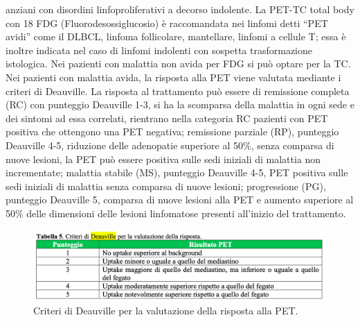 anziani con disordini linfoproliferativi a decorso indolente.
La PET-TC total body con 18 FDG (Fluorodesossiglucosio) è raccomandata nei linfomi detti “PET avidi” come il DLBCL, 
linfoma follicolare, mantellare, linfomi a cellule T; essa è inoltre indicata nel caso di linfomi indolenti con 
sospetta trasformazione istologica. Nei pazienti con malattia non avida per FDG si può optare per la TC\cite{reteveneta}.\\ 
Nei pazienti con malattia avida, la risposta alla PET viene valutata mediante i criteri di Deauville. 
La risposta al trattamento può essere di remissione completa (RC) con punteggio Deauville 1-3, si ha 
la scomparsa della malattia in ogni sede e dei sintomi ad essa correlati, rientrano nella categoria RC pazienti 
con PET positiva che ottengono una PET negativa; remissione parziale (RP), punteggio Deauville 4-5, riduzione 
delle adenopatie superiore al 50\%, senza comparsa di nuove lesioni, la PET può essere positiva sulle sedi iniziali 
di malattia non incrementate; malattia stabile (MS), punteggio Deauville 4-5, PET positiva sulle sedi iniziali di 
malattia senza comparsa di nuove lesioni; progressione (PG), punteggio Deauville 5, comparsa di nuove lesioni 
alla PET e aumento superiore al 50\% delle dimensioni delle lesioni linfomatose presenti all’inizio del trattamento\cite{AIOM}.\\

\begin{figure}[h]
    \begin{center}
    \includegraphics[width=1.0\columnwidth]{img/DEAUVILLE.png}
    \end{center}
    \caption[Criteri di Deauville per la valutazione della risposta alla PET.]{Criteri di Deauville per la valutazione della risposta alla PET.
    \cite{img21}}

\end{figure}

